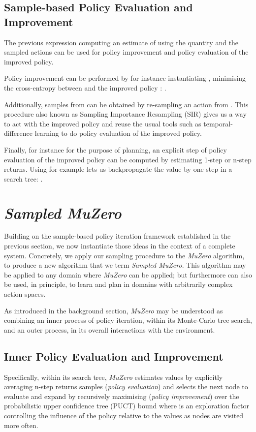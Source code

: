 \documentclass{article}
\newcommand{\muzero}{\emph{MuZero}}
\newcommand{\smuzero}{\emph{Sampled MuZero}}
\begin{document}
\subsection{Sample-based Policy Evaluation and Improvement}
The previous expression computing an estimate of  using the quantity  and the sampled actions  can be used for policy improvement and policy evaluation of the improved policy.

Policy improvement can be performed by for instance instantiating , minimising the cross-entropy between  and the improved policy : .

Additionally, samples from  can be obtained by re-sampling an action  from . This procedure also known as Sampling Importance Resampling (SIR) \cite{sir} gives us a way to act with the improved policy and reuse the usual tools such as temporal-difference learning to do policy evaluation of the improved policy.

Finally, for instance for the purpose of planning, an explicit step of policy evaluation of the improved policy can be computed by estimating 1-step or n-step returns. Using for example  lets us backpropagate the value  by one step in a search tree: .


\section{\smuzero{}}
Building on the sample-based policy iteration framework established in the previous section, we now instantiate those ideas in the context of a complete system. Concretely, we apply our sampling procedure to the \muzero{} algorithm, to produce a new algorithm that we term \smuzero{}. This algorithm may be applied to any domain where \muzero{} can be applied; but furthermore can also be used, in principle, to learn and plan in domains with arbitrarily complex action spaces.

As introduced in the background section, \muzero{} may be understood as combining an inner process of policy iteration, within its Monte-Carlo tree search, and an outer process, in its overall interactions with the environment.

\subsection{Inner Policy Evaluation and Improvement}
Specifically, within its search tree, \muzero{} estimates values by explicitly averaging n-step returns samples (\emph{policy evaluation}) and selects the next node to evaluate and expand by recursively maximising (\emph{policy improvement}) over the probabilistic upper confidence tree (PUCT) bound \cite{Silver16AG}  where  is an exploration factor controlling the influence of the policy  relative to the values  as nodes are visited more often.
\end{document}
